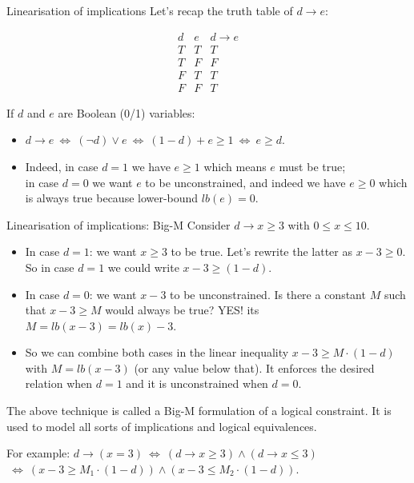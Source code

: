 \documentclass{cons-beamer}
\begin{document}
\begin{frame}{Linearisation of implications}
	Let's recap the truth table of $d \rightarrow e$:
	
	{\small \[
	\begin{array}{c|c||c}
		d & e & d \rightarrow e \\
		\hline
		T & T & T \\
		T & F & F \\
		F & T & T \\
		F & F & T
	\end{array}
	\] }
	\vfill
	
	If $d$ and $e$ are Boolean (0/1) variables: 
	\begin{itemize}
		\item $d \rightarrow e ~\Leftrightarrow~ (\neg d) \lor e ~\Leftrightarrow~ (1-d) + e \geq 1 ~\Leftrightarrow~ e \geq d$.
		\item Indeed, in case $d=1$ we have $e \geq 1$ which means $e$ must be true; \\
		in case $d=0$ we want $e$ to be unconstrained, and indeed we have $e \geq 0$ which is always true because lower-bound $lb(e) = 0$.
	\end{itemize}
\end{frame}

\begin{frame}{Linearisation of implications: Big-M}
	Consider $d \rightarrow x \geq 3$ with $0 \leq x \leq 10$.\\
	
	\begin{itemize}
		\item In case $d=1$: we want $x \geq 3$ to be true. Let's rewrite the latter as $x - 3 \geq 0$. So in case $d=1$ we could write $x - 3 \geq (1-d)$.
		\pause
		\item In case $d=0$: we want $x - 3$ to be unconstrained. Is there a constant $M$ such that $x - 3 \geq M$ would always be true? YES! its $M = lb(x - 3) = lb(x) - 3$.
		\pause
		\item So we can combine both cases in the linear inequality $x - 3 \geq M\cdot(1-d)$ with $M = lb(x-3)$ (or any value below that). It enforces the desired relation when $d=1$ and it is unconstrained when $d=0$.
	\end{itemize}
	\vfill
	\pause
	
	The above technique is called a Big-M formulation of a logical constraint. It is used to model all sorts of implications and logical equivalences. 
	\vfill
	
	For example: $d \rightarrow (x=3) ~\Leftrightarrow~ (d \rightarrow x \geq 3) \land (d \rightarrow x \leq 3)$ \\
	\qquad \qquad \qquad \qquad \qquad \qquad $~\Leftrightarrow~ (x - 3 \geq M_1\cdot (1-d)) \land (x - 3 \leq M_2\cdot (1-d))$.
\end{frame}
\end{document}
